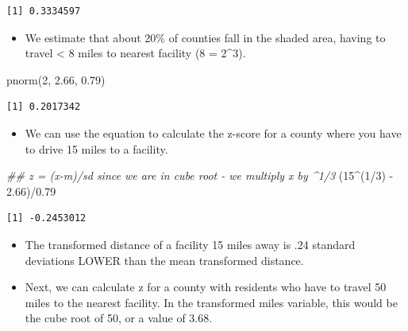 \documentclass[
  letterpaper,
  DIV=11,
  numbers=noendperiod]{scrreprt}
\newenvironment{Shaded}{\begin{snugshade}}{\end{snugshade}}
\newcommand{\DecValTok}[1]{\textcolor[rgb]{0.68,0.00,0.00}{#1}}
\newcommand{\DocumentationTok}[1]{\textcolor[rgb]{0.37,0.37,0.37}{\textit{#1}}}
\newcommand{\FloatTok}[1]{\textcolor[rgb]{0.68,0.00,0.00}{#1}}
\newcommand{\FunctionTok}[1]{\textcolor[rgb]{0.28,0.35,0.67}{#1}}
\newcommand{\NormalTok}[1]{\textcolor[rgb]{0.00,0.23,0.31}{#1}}
\newcommand{\SpecialCharTok}[1]{\textcolor[rgb]{0.37,0.37,0.37}{#1}}
\providecommand{\tightlist}{%
  \setlength{\itemsep}{0pt}\setlength{\parskip}{0pt}}\usepackage{longtable,booktabs,array}
\begin{document}
\begin{verbatim}
[1] 0.3334597
\end{verbatim}

\begin{itemize}
\tightlist
\item
  We estimate that about 20\% of counties fall in the shaded area,
  having to travel \textless{} 8 miles to nearest facility (8 = 2\^{}3).
\end{itemize}

\begin{Shaded}
\begin{Highlighting}[]
\FunctionTok{pnorm}\NormalTok{(}\DecValTok{2}\NormalTok{, }\FloatTok{2.66}\NormalTok{, }\FloatTok{0.79}\NormalTok{)}
\end{Highlighting}
\end{Shaded}

\begin{verbatim}
[1] 0.2017342
\end{verbatim}

\begin{itemize}
\tightlist
\item
  We can use the equation to calculate the z-score for a county where
  you have to drive 15 miles to a facility.
\end{itemize}

\begin{Shaded}
\begin{Highlighting}[]
\DocumentationTok{\#\# z = (x{-}m)/sd since we are in cube root {-} we multiply x by \^{}1/3}
\NormalTok{(}\DecValTok{15}\SpecialCharTok{\^{}}\NormalTok{(}\DecValTok{1}\SpecialCharTok{/}\DecValTok{3}\NormalTok{) }\SpecialCharTok{{-}} \FloatTok{2.66}\NormalTok{)}\SpecialCharTok{/}\FloatTok{0.79}
\end{Highlighting}
\end{Shaded}

\begin{verbatim}
[1] -0.2453012
\end{verbatim}

\begin{itemize}
\item
  The transformed distance of a facility 15 miles away is .24 standard
  deviations LOWER than the mean transformed distance.
\item
  Next, we can calculate z for a county with residents who have to
  travel 50 miles to the nearest facility. In the transformed miles
  variable, this would be the cube root of 50, or a value of 3.68.
\end{itemize}
\end{document}
